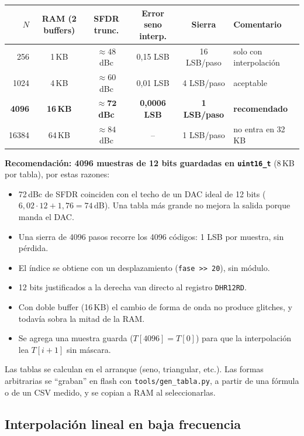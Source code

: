 \documentclass[11pt,a4paper]{article}
\begin{document}
\begin{center}
\begin{tabular}{@{}rccccl@{}}
\toprule
$N$ & RAM (2 buffers) & SFDR trunc. & Error seno interp. & Sierra & Comentario \\
\midrule
256   & 1\,KB  & $\approx 48$ dBc & 0,15 LSB    & 16 LSB/paso & solo con interpolación \\
1024  & 4\,KB  & $\approx 60$ dBc & 0,01 LSB    & 4 LSB/paso  & aceptable \\
\textbf{4096} & \textbf{16\,KB} & $\boldsymbol{\approx 72}$ \textbf{dBc} & \textbf{0,0006 LSB} & \textbf{1 LSB/paso} & \textbf{recomendado} \\
16384 & 64\,KB & $\approx 84$ dBc & --          & 1 LSB/paso  & no entra en 32\,KB \\
\bottomrule
\end{tabular}
\end{center}

\textbf{Recomendación: 4096 muestras de 12 bits guardadas en \texttt{uint16\_t}}
(8\,KB por tabla), por estas razones:
\begin{itemize}\itemsep0pt
  \item 72\,dBc de SFDR coinciden con el techo de un DAC ideal de 12 bits
        ($6{,}02\cdot12+1{,}76 = 74$\,dB). Una tabla más grande no mejora la
        salida porque manda el DAC.
  \item Una sierra de 4096 pasos recorre los 4096 códigos: 1 LSB por muestra, sin pérdida.
  \item El índice se obtiene con un desplazamiento (\texttt{fase >> 20}), sin módulo.
  \item 12 bits justificados a la derecha van directo al registro \texttt{DHR12RD}.
  \item Con doble buffer (16\,KB) el cambio de forma de onda no produce glitches,
        y todavía sobra la mitad de la RAM.
  \item Se agrega una muestra guarda ($T[4096]=T[0]$) para que la interpolación
        lea $T[i+1]$ sin máscara.
\end{itemize}
Las tablas se calculan en el arranque (seno, triangular, etc.). Las formas
arbitrarias se ``graban'' en flash con \texttt{tools/gen\_tabla.py}, a partir de
una fórmula o de un CSV medido, y se copian a RAM al seleccionarlas.

\subsection{Interpolación lineal en baja frecuencia}
\end{document}
